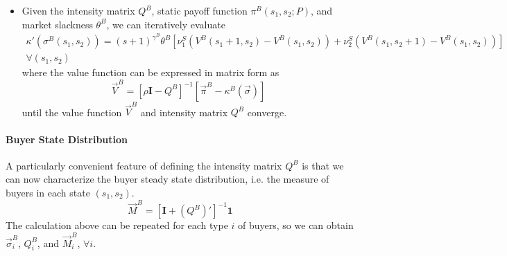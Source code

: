 \documentclass[12pt]{article} \usepackage{amsmath,amssymb,amsthm,geometry,graphicx,setspace,algorithm,algpseudocode,float}
\begin{document}
\begin{itemize}
\begin{itemize}
\item $I(s_1, s_2-1)=I(s_1,s_2)-(N_1+1)$ if $s_2\neq 0$
\item Any elements in the vectors $V^B$ and $s^B$ can be indexed by $I(s_1,s_2)$. Meanwhile, elements in matrix $Q^B$ can be indexed by $[I(s_1,s_2), I(s_1',s_2')]$ with $I(s_1',s_2')$ defined above. 
\end{itemize}
\item Given the intensity matrix $Q^B$, static payoff function $\pi^B(s_1,s_2;P)$, and market slackness $\theta^B$, we can iteratively evaluate 
\begin{align*}
\kappa'(\sigma^B(s_1,s_2)) = (s+1)^{\gamma^B}\theta^B[\nu_1^S (V^B(s_1+1,s_2) - V^B(s_1,s_2)) + \nu_2^S (V^B(s_1,s_2+1) - V^B(s_1,s_2))]\\
\forall (s_1,s_2)
\end{align*}
where the value function can be expressed in matrix form as
\[
\vec{V}^B = [\rho \mathbf{I} - Q^B]^{-1} [\vec{\pi}^B - \kappa^B(\vec{\sigma})]
\]
until the value function $\vec{V}^B$ and intensity matrix $Q^B$ converge.  
\end{itemize}
\paragraph{Buyer State Distribution}
A particularly convenient feature of defining the intensity matrix $Q^B$ is that we can now characterize the buyer steady state distribution, i.e. the measure of buyers in each state $(s_1,s_2)$. 
\[
  \vec{M}^B = [\mathbf{I} + (Q^B)']^{-1} \mathbf{1} 
\]
The calculation above can be repeated for each type $i$ of buyers, so we can obtain $\vec{\sigma}^B_i$, $Q^B_i$, and $\vec{M}^B_i$, $\forall i$. 
\end{document}
